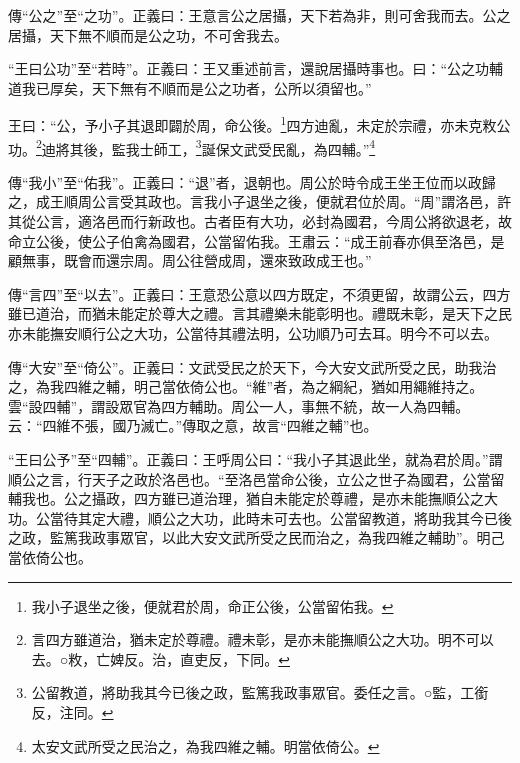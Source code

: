 {\noindent\zhuan{}\fzbyks 傳“公之”至“之功”。正義曰：王意言公之居攝，天下若為非，則可舍我而去。公之居攝，天下無不順而是公之功，不可舍我去。 \par}

{\noindent\shu{}\fzkt “王曰公功”至“若時”。正義曰：王又重述前言，還說居攝時事也。曰：“公之功輔道我已厚矣，天下無有不順而是公之功者，公所以須留也。” \par}

王曰：“公，予小子其退即闢於周，命公後。\footnote{我小子退坐之後，便就君於周，命正公後，公當留佑我。}四方迪亂，未定於宗禮，亦未克敉公功。\footnote{言四方雖道治，猶未定於尊禮。禮未彰，是亦未能撫順公之大功。明不可以去。○敉，亡婢反。治，直吏反，下同。}迪將其後，監我士師工，\footnote{公留教道，將助我其今已後之政，監篤我政事眾官。委任之言。○監，工銜反，注同。}誕保文武受民亂，為四輔。”\footnote{太安文武所受之民治之，為我四維之輔。明當依倚公。}


{\noindent\zhuan{}\fzbyks 傳“我小”至“佑我”。正義曰：“退”者，退朝也。周公於時令成王坐王位而以政歸之，成王順周公言受其政也。言我小子退坐之後，便就君位於周。“周”謂洛邑，許其從公言，適洛邑而行新政也。古者臣有大功，必封為國君，今周公將欲退老，故命立公後，使公子伯禽為國君，公當留佑我。王肅云：“成王前春亦俱至洛邑，是顧無事，既會而還宗周。周公往營成周，還來致政成王也。” \par}

{\noindent\zhuan{}\fzbyks 傳“言四”至“以去”。正義曰：王意恐公意以四方既定，不須更留，故謂公云，四方雖已道治，而猶未能定於尊大之禮。言其禮樂未能彰明也。禮既未彰，是天下之民亦未能撫安順行公之大功，公當待其禮法明，公功順乃可去耳。明今不可以去。 \par}

{\noindent\zhuan{}\fzbyks 傳“大安”至“倚公”。正義曰：文武受民之於天下，今大安文武所受之民，助我治之，為我四維之輔，明己當依倚公也。“維”者，為之綱紀，猶如用繩維持之。雲“設四輔”，謂設眾官為四方輔助。周公一人，事無不統，故一人為四輔。云：“四維不張，國乃滅亡。”傳取之意，故言“四維之輔”也。 \par}

{\noindent\shu{}\fzkt “王曰公予”至“四輔”。正義曰：王呼周公曰：“我小子其退此坐，就為君於周。”謂順公之言，行天子之政於洛邑也。“至洛邑當命公後，立公之世子為國君，公當留輔我也。公之攝政，四方雖已道治理，猶自未能定於尊禮，是亦未能撫順公之大功。公當待其定大禮，順公之大功，此時未可去也。公當留教道，將助我其今已後之政，監篤我政事眾官，以此大安文武所受之民而治之，為我四維之輔助”。明己當依倚公也。 \par}

